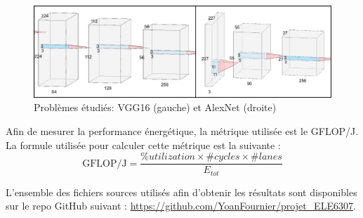 \documentclass[11pt,letterpaper]{article}
\begin{document}
\begin{multicols}{2}
    \begin{figure}[H]
        \centering
        \includegraphics[width=\linewidth]{probs.png}
        \caption{Problèmes étudiés: VGG16 (gauche) et AlexNet (droite)}
        \label{fig:probs}
    \end{figure}

    Afin de mesurer la performance énergétique, la métrique utilisée est le GFLOP/J. La 
    formule utilisée pour calculer cette métrique est la suivante :
    $$\text{GFLOP/J} = \frac{\%utilization \times \#cycles \times \#lanes}{E_{tot}}$$

    L'ensemble des fichiers sources utilisés afin d'obtenir les résultats sont disponibles
    sur le repo GitHub suivant : \url{https://github.com/YoanFournier/projet_ELE6307}.

    \end{multicols}
\end{document}
